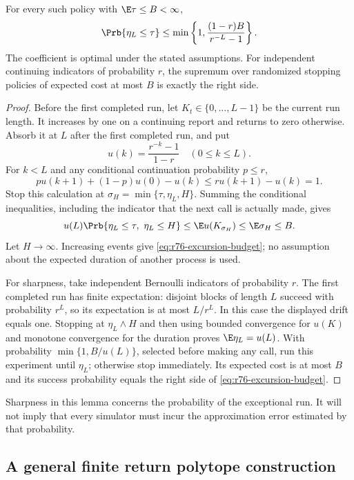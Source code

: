 \begin{lemma}
\label{lem:r76-excursion-budget}
For every such policy with $\E\tau\le B<\infty$,
\begin{equation}\label{eq:r76-excursion-budget}
 \Prb\{\eta_L\le\tau\}
 \le \min\left\{1,\frac{(1-r)B}{r^{-L}-1}\right\}.
\end{equation}
The coefficient is optimal under the stated assumptions.  For independent
continuing indicators of probability $r$, the supremum over randomized
stopping policies of expected cost at most $B$ is exactly the right side.
\end{lemma}
\begin{proof}
Before the first completed run, let $K_t\in\{0,\ldots,L-1\}$ be the
current run length.  It increases by one on a continuing report and
returns to zero otherwise.  Absorb it at $L$ after the first completed
run, and put
\[
 u(k)=\frac{r^{-k}-1}{1-r}\quad(0\le k\le L).
\]
For $k<L$ and any conditional continuation probability $p\le r$,
\[
 p u(k+1)+(1-p)u(0)-u(k)
 \le r u(k+1)-u(k)=1.
\]
Stop this calculation at $\sigma_H=\min\{\tau,\eta_L,H\}$.
Summing the conditional inequalities, including the indicator that the
next call is actually made, gives
\[
 u(L)\Prb\{\eta_L\le\tau,\ \eta_L\le H\}
 \le \E u(K_{\sigma_H})\le\E\sigma_H\le B.
\]
Let $H\to\infty$.  Increasing events give
\eqref{eq:r76-excursion-budget}; no assumption about the expected duration
of another process is used.

For sharpness, take independent Bernoulli indicators of probability $r$.
The first completed run has finite expectation: disjoint blocks of length
$L$ succeed with probability $r^L$, so its expectation is at most
$L/r^L$.  In this case the displayed drift equals one.  Stopping at
$\eta_L\wedge H$ and then using bounded convergence for $u(K)$ and
monotone convergence for the duration proves
$\E\eta_L=u(L)$.  With probability
$\min\{1,B/u(L)\}$, selected before making any call, run this experiment
until $\eta_L$; otherwise stop immediately.  Its expected cost is at most
$B$ and its success probability equals the right side of
\eqref{eq:r76-excursion-budget}.
\end{proof}

Sharpness in this lemma concerns the probability of the exceptional
run.  It will not imply that every simulator must incur the approximation
error estimated by that probability.

\subsection{A general finite return polytope construction}

